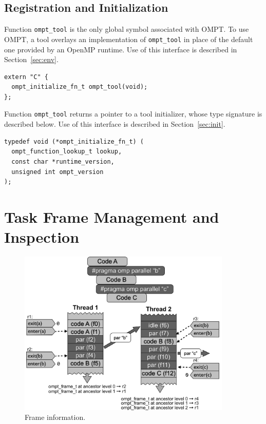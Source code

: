 \documentclass{article}
\begin{document}
\clearpage
\subsection{Registration and Initialization} 
\label{sec:app:init}

\noindent
Function \lstinline|ompt_tool| is the only global symbol associated with OMPT. To use OMPT, a tool overlays an implementation of \lstinline|ompt_tool| in place of the default one provided by an OpenMP runtime. Use of this interface is described in Section~\ref{sec:env}.
\begin{lstlisting}
extern "C" {
  ompt_initialize_fn_t ompt_tool(void);
};
\end{lstlisting}
Function \lstinline|ompt_tool| returns a pointer to a tool initializer, whose type signature is described below. Use of this interface is described in Section~\ref{sec:init}.

\begin{lstlisting}
typedef void (*ompt_initialize_fn_t) (
  ompt_function_lookup_t lookup,
  const char *runtime_version, 
  unsigned int ompt_version
);
\end{lstlisting}



\clearpage
\section{Task Frame Management and Inspection}
\label{app:frame}

   \begin{figure}[h]
    \centering
        \includegraphics[width=4in]{callstack-cropped.pdf}
    \caption{Frame information.}
    \label{fig:frame}
\end{figure}
\end{document}
